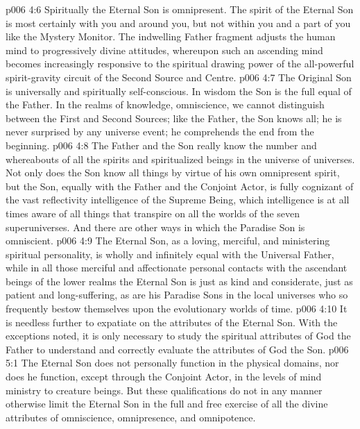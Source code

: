 \vs p006 4:6 Spiritually the Eternal Son is omnipresent. The spirit of the Eternal Son is most certainly with you and around you, but not within you and a part of you like the Mystery Monitor. The indwelling Father fragment adjusts the human mind to progressively divine attitudes, whereupon such an ascending mind becomes increasingly responsive to the spiritual drawing power of the all\hyp{}powerful spirit\hyp{}gravity circuit of the Second Source and Centre.
\vs p006 4:7 \pc The Original Son is universally and spiritually self\hyp{}conscious. In wisdom the Son is the full equal of the Father. In the realms of knowledge, omniscience, we cannot distinguish between the First and Second Sources; like the Father, the Son knows all; he is never surprised by any universe event; he comprehends the end from the beginning.
\vs p006 4:8 \pc The Father and the Son really know the number and whereabouts of all the spirits and spiritualized beings in the universe of universes. Not only does the Son know all things by virtue of his own omnipresent spirit, but the Son, equally with the Father and the Conjoint Actor, is fully cognizant of the vast reflectivity intelligence of the Supreme Being, which intelligence is at all times aware of all things that transpire on all the worlds of the seven superuniverses. And there are other ways in which the Paradise Son is omniscient.
\vs p006 4:9 \pc The Eternal Son, as a loving, merciful, and ministering spiritual personality, is wholly and infinitely equal with the Universal Father, while in all those merciful and affectionate personal contacts with the ascendant beings of the lower realms the Eternal Son is just as kind and considerate, just as patient and long\hyp{}suffering, as are his Paradise Sons in the local universes who so frequently bestow themselves upon the evolutionary worlds of time.
\vs p006 4:10 It is needless further to expatiate on the attributes of the Eternal Son. With the exceptions noted, it is only necessary to study the spiritual attributes of God the Father to understand and correctly evaluate the attributes of God the Son.
\vs p006 5:1 The Eternal Son does not personally function in the physical domains, nor does he function, except through the Conjoint Actor, in the levels of mind ministry to creature beings. But these qualifications do not in any manner otherwise limit the Eternal Son in the full and free exercise of all the divine attributes of  omniscience, omnipresence, and omnipotence.
